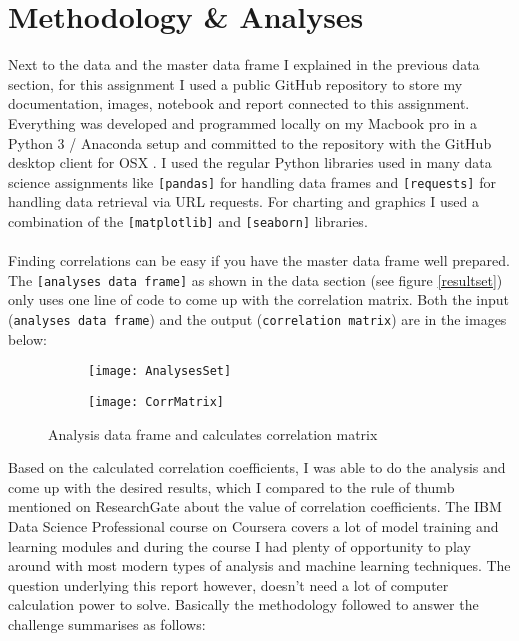 \section{Methodology \& Analyses}
Next to the data and the master data frame I explained in the previous data section, for this assignment I used a public GitHub repository \cite{GIT1} to store my documentation, images, notebook and report connected to this assignment. Everything was developed and programmed locally on my Macbook pro in a Python 3 / Anaconda setup and committed to the repository with the GitHub desktop client for OSX \cite{GIT2}. I used the regular Python libraries used in many data science assignments like \texttt{[pandas]} for handling data frames and \texttt{[requests]} for handling data retrieval via URL requests. For charting and graphics I used a combination of the \texttt{[matplotlib]} and \texttt{[seaborn]} libraries.
\\\\
Finding correlations can be easy if you have the master data frame well prepared. The \texttt{[analyses data frame]} as shown in the data section (see figure \ref{resultset}) only uses one line of code to come up with the correlation matrix. Both the input (\texttt{analyses data frame}) and the output (\texttt{correlation matrix}) are in the images below:
\\
\medskip
\begin{figure}[H]
	\begin{subfigure}{0.5\textwidth}
		\centering
		\texttt{[image: AnalysesSet]} 
		\caption{}
	\end{subfigure}
	\begin{subfigure}{0.5\textwidth}
		\centering
		\texttt{[image: CorrMatrix]}
		\caption{}
		\label{corMatrix}
	\end{subfigure}
\caption{Analysis data frame and calculates correlation matrix}
\end{figure}
\medskip
Based on the calculated correlation coefficients, I was able to do the analysis and come up with the desired results, which I compared to the rule of thumb mentioned on ResearchGate \cite{ART1} about the value of correlation coefficients. The IBM Data Science Professional course on Coursera covers a lot of model training and learning modules and during the course I had plenty of opportunity to play around with most modern types of analysis and machine learning techniques. The question underlying this report however, doesn't need a lot of computer calculation power to solve. Basically the methodology followed to answer the challenge summarises as follows:

